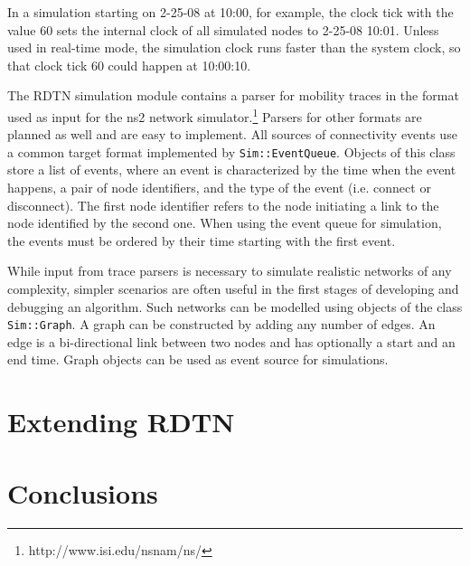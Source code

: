 \documentclass{article}
\begin{document}
In a simulation starting on 2-25-08 at 10:00, for example, the clock tick
with the value $60$ sets the internal clock of all simulated nodes to 2-25-08
10:01. Unless used in real-time mode, the simulation clock runs faster than the
system clock, so that clock tick $60$ could happen at 10:00:10.

The RDTN simulation module contains a parser for mobility traces in the format
used as input for the ns2 network
simulator.\footnote{http://www.isi.edu/nsnam/ns/} Parsers for other formats are
planned as well and are easy to implement. All sources of connectivity events
use a common target format implemented by {\tt Sim::EventQueue}. Objects of this
class store a list of events, where an event is characterized by the time when
the event happens, a pair of node identifiers, and the type of the event (i.e.
connect or disconnect). The first node identifier refers to the node initiating
a link to the node identified by the second one. When using the event queue for
simulation, the events must be ordered by their time starting with the first
event.

While input from trace parsers is necessary to simulate realistic networks of
any complexity, simpler scenarios are often useful in the first stages of
developing and debugging an algorithm. Such networks can be modelled using
objects of the class {\tt Sim::Graph}. A graph can be constructed by adding any
number of edges. An edge is a bi-directional link between two nodes and has
optionally a start and an end time. Graph objects can be used as event source
for simulations.

\section{Extending RDTN}\label{sec.extending}

\section{Conclusions}\label{sec.conclusions}

%
\end{document}

